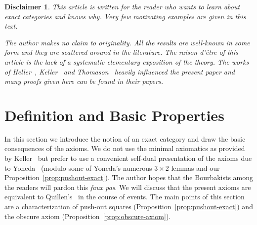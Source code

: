 \documentclass[1p]{elsarticle}
\theoremstyle{mythm}
\theoremstyle{mydef}
\newtheorem*{Disclaimer}{Disclaimer}
\begin{document}
\begin{Disclaimer}
  This article is written for the reader who \emph{wants}
  to learn about exact categories and knows \emph{why}. 
  Very few motivating examples are given in this text.
  
  The author makes no claim to originality. All the results
  are well-known in some form and they are scattered around in the
  literature. The \emph{raison d'\^{e}tre} of this article is the lack
  of a systematic \emph{elementary} exposition of the theory. 
  The works of Heller~\cite{MR0100622},
  Keller~\cite{MR1052551,MR1421815} and Thomason~\cite{MR1106918}
  heavily influenced the present paper and many proofs given here
  can be found in their papers.
\end{Disclaimer}

\section{Definition and Basic Properties}
\label{sec:def-basic-properties}

In this section we introduce the notion of an exact category and draw
the basic consequences of the axioms. We do not use the minimal
axiomatics as provided by Keller~\cite[Appendix~A]{MR1052551} but
prefer to use a convenient self-dual presentation of the axioms due to
Yoneda~\cite[\S~2]{MR0225854} (modulo some of Yoneda's numerous 
$3 \times 2$-lemmas and our Proposition~\ref{prop:pushout-exact}). The
author hopes that the Bourbakists among the readers will 
pardon this \emph{faux pas}. We will discuss that the present axioms are
equivalent to Quillen's~\cite[\S~2]{MR0338129} in the course of
events. The main points of this section are a characterization of
push-out squares (Proposition~\ref{prop:pushout-exact}) and the
obscure axiom (Proposition~\ref{prop:obscure-axiom}).
\end{document}
